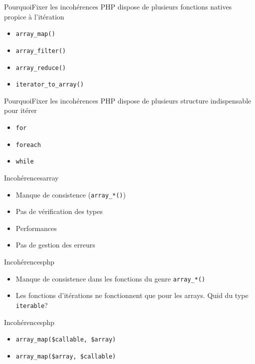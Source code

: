 \begin{frame}{Pourquoi}{Fixer les incohérences}
    PHP dispose de plusieurs fonctions natives propice à l'itération

    \begin{itemize}[<+->]
        \item \texttt{array\_map()}
        \item \texttt{array\_filter()}
        \item \texttt{array\_reduce()}
        \item \texttt{iterator\_to\_array()}
    \end{itemize}
\end{frame}

\begin{frame}{Pourquoi}{Fixer les incohérences}
    PHP dispose de plusieurs structure indispensable pour itérer

    \begin{itemize}[<+->]
        \item \texttt{for}
        \item \texttt{foreach}
        \item \texttt{while}
    \end{itemize}
\end{frame}

\begin{frame}{Incohérences}{array}
    \begin{itemize}[<+->]
        \item Manque de consistence (\texttt{array\_*()})
        \item Pas de vérification des types
        \item Performances
        \item Pas de gestion des erreurs
    \end{itemize}
\end{frame}

\begin{frame}{Incohérences}{php}
    \begin{itemize}[<+->]
        \item Manque de consistence dans les fonctions du genre \texttt{array\_*()}
        \item Les fonctions d'itérations ne fonctionnent que pour les arrays. Quid du type \texttt{iterable}?
    \end{itemize}
\end{frame}

\begin{frame}{Incohérences}{php}
    \begin{itemize}[<+->]
        \item \texttt{array\_map(\$callable, \$array)}
        \item \texttt{array\_map(\$array, \$callable)}
    \end{itemize}
\end{frame}

